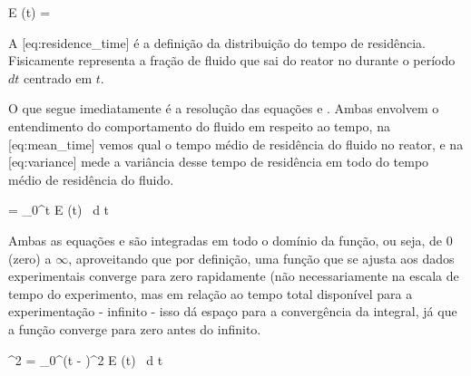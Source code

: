     \startplaceformula[reference={eq:residence_time}]
        \startformula
            E (t) = 
        \stopformula
    \stopplaceformula

    A [eq:residence_time] é a definição da distribuição do tempo de residência. Fisicamente representa a fração de fluido que sai do reator no durante o período $dt$ centrado em $t$.

    O que segue imediatamente é a resolução das equações  e \in[eq:variance]. Ambas envolvem o entendimento do comportamento do fluido em respeito ao tempo, na [eq:mean_time] vemos qual o tempo médio de residência do fluido no reator, e na [eq:variance] mede a variância desse tempo de residência em todo do tempo médio de residência do fluido.

    \startplaceformula[reference={eq:mean_time}]
        \startformula
            \getbuffer[tm] = \int_0^\infty t E (t) \, d t
        \stopformula
    \stopplaceformula

    Ambas as equações  e \in[eq:variance] são integradas em todo o domínio da função, ou seja, de $0$ (zero) a $\infty$, aproveitando que por definição, uma função que se ajusta aos dados experimentais converge para zero rapidamente (não necessariamente na escala de tempo do experimento, mas em relação ao tempo total disponível para a experimentação - infinito - isso dá espaço para a convergência da integral, já que a função converge para zero antes do infinito.

    \startplaceformula[reference={eq:variance}]
        \startformula
            \sigma^2 = \int_0^\infty (t - \getbuffer[tm])^2 E (t) \, d t
        \stopformula
    \stopplaceformula
\stopchapter

